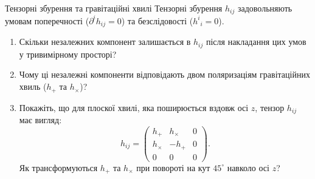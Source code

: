 \begin{problem}{Тензорні збурення та гравітаційні хвилі}
Тензорні збурення $h_{ij}$ задовольняють умовам поперечності ($\partial^i h_{ij}=0$)
та безслідовості ($h^i{}_i=0$).

\begin{enumerate}
    \item Скільки незалежних компонент залишається в $h_{ij}$ після накладання
          цих умов у тривимірному просторі?
    \item Чому ці незалежні компоненти відповідають двом поляризаціям
          гравітаційних хвиль ($h_+$ та $h_\times$)?
    \item Покажіть, що для плоскої хвилі, яка поширюється вздовж осі $z$,
          тензор $h_{ij}$ має вигляд:
          \[
          h_{ij} = \begin{pmatrix} h_+ & h_\times & 0 \\ h_\times & -h_+ & 0 \\ 0 & 0 & 0 \end{pmatrix}.
          \]
          Як трансформуються $h_+$ та $h_\times$ при повороті на кут $45^\circ$ навколо осі $z$?
\end{enumerate}
\end{problem}